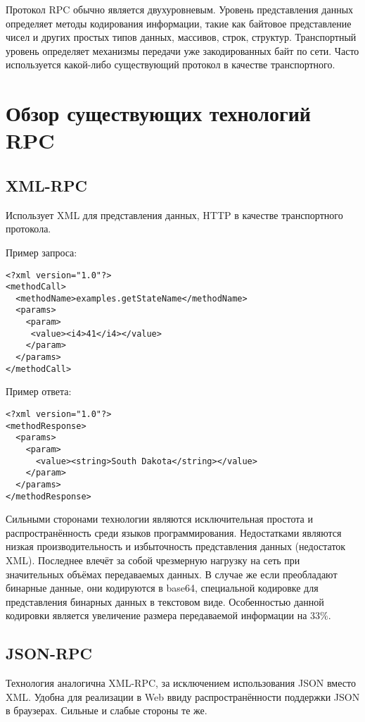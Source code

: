Протокол RPC обычно является двухуровневым.
Уровень представления данных определяет методы кодирования информации,
такие как байтовое представление чисел и других простых типов данных,
массивов, строк, структур.
Транспортный уровень определяет механизмы передачи уже закодированных байт
по сети. Часто используется какой-либо существующий протокол в качестве
транспортного.

\section{Обзор существующих технологий RPC}
\subsection{XML-RPC}
Использует XML для представления данных, HTTP в качестве транспортного протокола.

\noindent Пример запроса:
\begin{verbatim}
<?xml version="1.0"?>
<methodCall>
  <methodName>examples.getStateName</methodName>
  <params>
    <param>
     <value><i4>41</i4></value>
    </param>
  </params>
</methodCall>
\end{verbatim}

\noindent Пример ответа:
\begin{verbatim}
<?xml version="1.0"?>
<methodResponse>
  <params>
    <param>
      <value><string>South Dakota</string></value>
    </param>
  </params>
</methodResponse>
\end{verbatim}

Сильными сторонами технологии являются исключительная простота
и распространённость среди языков программирования. Недостатками являются
низкая производительность и избыточность представления данных (недостаток XML).
Последнее влечёт за собой чрезмерную нагрузку на сеть при значительных объёмах
передаваемых данных. В случае же если преобладают бинарные данные,
они кодируются в base64, специальной кодировке для представления бинарных
данных в текстовом виде. Особенностью данной кодировки является увеличение
размера передаваемой информации на 33\%.

\subsection{JSON-RPC}
Технология аналогична XML-RPC, за исключением использования JSON вместо XML.
Удобна для реализации в Web ввиду распространённости поддержки JSON
в браузерах. Сильные и слабые стороны те же.

